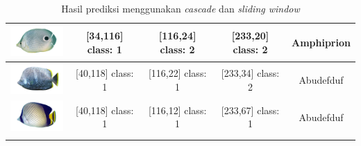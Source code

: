 \begin{longtable}{|c|c|c|c|c|}
	\includegraphics[width=3cm]{gambar/dataset_validasi/Chaetodon23} & [34,116] class: 1 & [116,24] class: 2 & [233,20] class: 2 & Amphiprion \\ \hline
	\includegraphics[width=3cm]{gambar/dataset_validasi/Chaetodon24} & [40,118] class: 1 & [116,22] class: 1 & [233,34] class: 2 & Abudefduf \\ \hline
	\includegraphics[width=3cm]{gambar/dataset_validasi/Chaetodon25} & [40,118] class: 1 & [116,12] class: 1 & [233,67] class: 1 & Abudefduf \\ \hline

	
	\caption{Hasil prediksi menggunakan \emph{cascade} dan \emph{sliding window}}
	\label{tab: Classification result}
  \end{longtable}